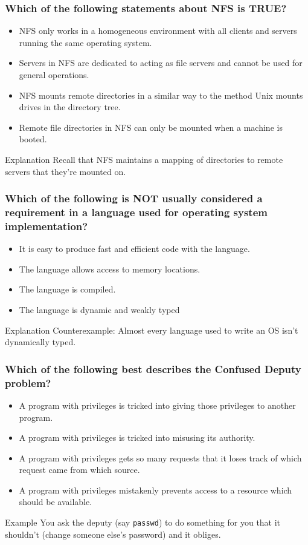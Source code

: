 \documentclass{beamer}
\begin{document}
\begin{frame}
  \frametitle{Which of the following statements about NFS is TRUE?}
  \begin{itemize}
    \item NFS only works in a homogeneous environment with all clients and servers running the same operating system.
    \item Servers in NFS are dedicated to acting as file servers and cannot be used for general operations.
    \item<alert@2> NFS mounts remote directories in a similar way to the method Unix mounts drives in the directory tree.
    \item Remote file directories in NFS can only be mounted when a machine is booted.
  \end{itemize}
  \pause
  \begin{block}{Explanation}
    Recall that NFS maintains a mapping of directories to remote servers that they're mounted on.
  \end{block}
\end{frame}
\begin{frame}
  \frametitle{Which of the following is NOT usually considered a requirement in a language used for operating system implementation?}
  \begin{itemize}
    \item It is easy to produce fast and efficient code with the language.
    \item The language allows access to memory locations.
    \item The language is compiled.
    \item<alert@2> The language is dynamic and weakly typed
  \end{itemize}
  \pause
  \begin{block}{Explanation}
    Counterexample: Almost every language used to write an OS isn't dynamically typed.
  \end{block}
\end{frame}
\begin{frame}
  \frametitle{Which of the following best describes the Confused Deputy problem?}
  \begin{itemize}
    \item A program with privileges is tricked into giving those privileges to another program.
    \item<alert@2> A program with privileges is tricked into misusing its authority.
    \item A program with privileges gets so many requests that it loses track of which request came from which source.
    \item A program with privileges mistakenly prevents access to a resource which should be available. 
  \end{itemize}
  \pause
  \begin{block}{Example}
    You ask the deputy (say \texttt{passwd}) to do something for you that it shouldn't (change someone else's password) and it obliges.
  \end{block}
\end{frame}
\end{document}
